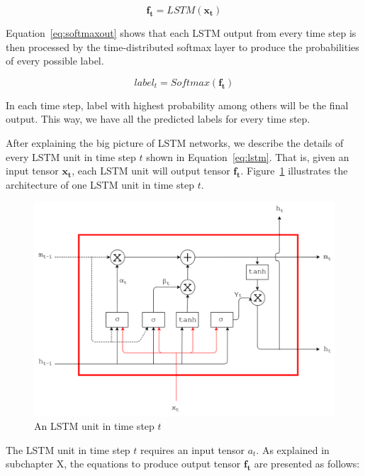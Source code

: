 \begin{equation}
\label{eq:lstm}
\mathbf{f_{t}} = LSTM(\mathbf{x_{t}})
\end{equation}

Equation~\ref{eq:softmaxout} shows that each LSTM output from every time step is then processed by the time-distributed softmax layer to produce the probabilities of every possible label.

\begin{equation}
\label{eq:softmaxout}
label_{t} = Softmax(\mathbf{f_{t}})
\end{equation}

In each time step, label with highest probability among others will be the final output. This way, we have all the predicted labels for every time step.

After explaining the big picture of LSTM networks, we describe the details of every LSTM unit in time step $t$ shown in Equation~\ref{eq:lstm}. That is, given an input tensor $\mathbf{x_{t}}$, each LSTM unit will output tensor $\mathbf{f_{t}}$. Figure~\ref{fig:lstmunit} illustrates the architecture of one LSTM unit in time step $t$.

\begin{figure}
	\centering
	\includegraphics[width=0.85\linewidth]{images/lstm}
	\caption{An LSTM unit in time step $t$}
	\label{fig:lstmunit}
\end{figure}

The LSTM unit in time step $t$ requires an input tensor $a_{t}$. As explained in subchapter X, the equations to produce output tensor $\mathbf{f_{t}}$ are presented as follows:

